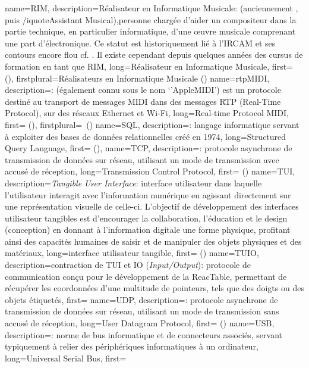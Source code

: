 {
    name={RIM},
    description={Réalisateur en Informatique Musicale: (anciennement , puis /iquote{Assistant Musical}),personne chargée d'aider un compositeur dans la partie technique, en particulier informatique, d'une œuvre musicale comprenant une part d'électronique. Ce statut est historiquement lié à l'IRCAM et ses contours encore flou cf. \cite{zattra_les_2013}. Il existe cependant depuis quelques années des cursus de formation en tant que RIM},
    long={Réalisateur en Informatique Musicale},
    first={} (),
    firstplural={Réalisateurs en Informatique Musicale (\glspluralsuffix)}
}
{
    name={rtpMIDI},
    description={\textit{}: (également connu sous le nom `'AppleMIDI') est un protocole destiné au transport de messages MIDI dans des messages RTP (Real-Time Protocol), sur des réseaux Ethernet et Wi-Fi},
    long={Real-time Protocol MIDI},
    first={} (),
    firstplural={\glspluralsuffix\ (\glspluralsuffix)}
}
{
    name={SQL},
    description={\textit{}: langage informatique servant à exploiter des bases de données relationnelles créé en 1974},
    long={Structured Query Language},
    first={} (),
}
{
    name={TCP},
    description={\textit{}: protocole asynchrone de transmission de données sur réseau, utilisant un mode de transmission avec accusé de réception},
    long={Transmission Control Protocol},
    first={} ()
}
{
    name={TUI},
    description={\textit{Tangible User Interface}: interface utilisateur dans laquelle l'utilisateur interagit avec l'information numérique en agissant directement sur une représentation visuelle de celle-ci. L'objectif de développement des interfaces utilisateur tangibles est d'encourager la collaboration, l'éducation et le design (conception) en donnant à l'information digitale une forme physique, profitant ainsi des capacités humaines de saisir et de manipuler des objets physiques et des matériaux},
    long={interface utilisateur tangible},
    first={} ()
}
{
    name={TUIO},
    description={contraction de \gls{TUI} et IO (\textit{Input/Output}): protocole de communication conçu pour le développement de la ReacTable, permettant de récupérer les coordonnées d'une multitude de pointeurs, tels que des doigts ou des objets étiquetés},
    first={}
}
{
    name={UDP},
    description={\textit{}: protocole asynchrone de transmission de données sur réseau, utilisant un mode de transmission sans accusé de réception},
    long={User Datagram Protocol},
    first={} ()
}
{
    name={USB},
    description={\textit{}: norme de bus informatique et de connecteurs associés, servant typiquement à relier des périphériques informatiques à un ordinateur},
    long={Universal Serial Bus},
    first={}
}


%

